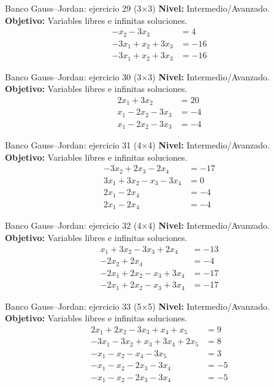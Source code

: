 \documentclass[aspectratio=169,9pt]{beamer}
\theoremstyle{remark}
\begin{document}
\begin{frame}[t]{Banco Gauss--Jordan: ejercicio 29 (3$\times$3)}
\textbf{Nivel:} Intermedio/Avanzado.\\
\textbf{Objetivo:} Variables libres e infinitas soluciones.
\[
\begin{aligned}
- x_{2} - 3 x_{3} &= 4\\
- 3 x_{1} + x_{2} + 3 x_{3} &= -16\\
- 3 x_{1} + x_{2} + 3 x_{3} &= -16
\end{aligned}
\]
\end{frame}
\begin{frame}[t]{Banco Gauss--Jordan: ejercicio 30 (3$\times$3)}
\textbf{Nivel:} Intermedio/Avanzado.\\
\textbf{Objetivo:} Variables libres e infinitas soluciones.
\[
\begin{aligned}
2 x_{1} + 3 x_{2} &= 20\\
x_{1} - 2 x_{2} - 3 x_{3} &= -4\\
x_{1} - 2 x_{2} - 3 x_{3} &= -4
\end{aligned}
\]
\end{frame}
\begin{frame}[t]{Banco Gauss--Jordan: ejercicio 31 (4$\times$4)}
\textbf{Nivel:} Intermedio/Avanzado.\\
\textbf{Objetivo:} Variables libres e infinitas soluciones.
\[
\begin{aligned}
- 3 x_{2} + 2 x_{3} - 2 x_{4} &= -17\\
3 x_{1} + 3 x_{2} - x_{3} - 3 x_{4} &= 0\\
2 x_{1} - 2 x_{4} &= -4\\
2 x_{1} - 2 x_{4} &= -4
\end{aligned}
\]
\end{frame}
\begin{frame}[t]{Banco Gauss--Jordan: ejercicio 32 (4$\times$4)}
\textbf{Nivel:} Intermedio/Avanzado.\\
\textbf{Objetivo:} Variables libres e infinitas soluciones.
\[
\begin{aligned}
x_{1} + 3 x_{2} - 3 x_{3} + 2 x_{4} &= -13\\
- 2 x_{2} + 2 x_{4} &= -4\\
- 2 x_{1} + 2 x_{2} - x_{3} + 3 x_{4} &= -17\\
- 2 x_{1} + 2 x_{2} - x_{3} + 3 x_{4} &= -17
\end{aligned}
\]
\end{frame}
\begin{frame}[t]{Banco Gauss--Jordan: ejercicio 33 (5$\times$5)}
\textbf{Nivel:} Intermedio/Avanzado.\\
\textbf{Objetivo:} Variables libres e infinitas soluciones.
\[
\begin{aligned}
2 x_{1} + 2 x_{2} - 3 x_{3} + x_{4} + x_{5} &= 9\\
- 3 x_{1} - 3 x_{2} + x_{3} + 3 x_{4} + 2 x_{5} &= 8\\
- x_{1} - x_{2} - x_{4} - 3 x_{5} &= 3\\
- x_{1} - x_{2} - 2 x_{3} - 3 x_{4} &= -5\\
- x_{1} - x_{2} - 2 x_{3} - 3 x_{4} &= -5
\end{aligned}
\]
\end{frame}
\end{document}
